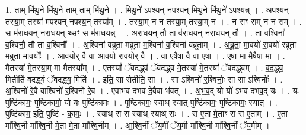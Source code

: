 \documentclass[17pt]{extarticle}
\begin{document}
1. ताम् मि॑थु॒ने मि॑थु॒ने ताम् ताम् मि॑थु॒ने । . मि॒थु॒ने॑ ऽपश्यन् नपश्यन् मिथु॒ने मि॑थु॒ने॑ ऽपश्यन्न् । . अ॒प॒श्य॒न् तस्या॒म् तस्या॑ मपश्यन् नपश्य॒न् तस्या᳚म् । . तस्या॒म् न न तस्या॒म् तस्या॒म् न । . न सꣳ सम् न न सम् । . स म॑राधयन् नराधय॒न् थ्सꣳ स म॑राधयन्न् । . अ॒रा॒ध॒य॒न् तौ ता व॑राधयन् नराधय॒न् तौ । . ता व॒श्विना॑ व॒श्विनौ॒ तौ ता व॒श्विनौ᳚ । . अ॒श्विना॑ वब्रूता मब्रूता म॒श्विना॑ व॒श्विना॑ वब्रूताम् । . अ॒ब्रू॒ता॒ मा॒वयो॑ रा॒वयो॑ रब्रूता मब्रूता मा॒वयोः᳚ । . आ॒वयो॒र् वै वा आ॒वयो॑ रा॒वयो॒र् वै । . वा ए॒षैषा वै वा ए॒षा । . ए॒षा मा मैषैषा मा । . मैतस्या॑ मे॒तस्या॒म् मा मैतस्या᳚म् । . ए॒तस्यां᳚ ॅवदद्ध्वं ॅवदद्ध्व मे॒तस्या॑ मे॒तस्यां᳚ ॅवदद्ध्वम् । . व॒द॒द्ध्व॒ मितीति॑ वदद्ध्वं ॅवदद्ध्व॒ मिति॑ । . इति॒ सा सेतीति॒ सा । . सा ऽश्विनो॑ र॒श्विनोः॒ सा सा ऽश्विनोः᳚ । . अ॒श्विनो॑ रे॒वै वाश्विनो॑ र॒श्विनो॑ रे॒व । . ए॒वाभ॑व दभव दे॒वैवा भ॑वत् । . अ॒भ॒व॒द् यो यो॑ ऽभव दभव॒द् यः । . यः पुष्टि॑कामः॒ पुष्टि॑कामो॒ यो यः पुष्टि॑कामः । . पुष्टि॑कामः॒ स्याथ् स्यात् पुष्टि॑कामः॒ पुष्टि॑कामः॒ स्यात् । . पुष्टि॑काम॒ इति॒ पुष्टि॑ - का॒मः॒ । . स्याथ् स स स्याथ् स्याथ् सः । . स ए॒ता मे॒ताꣳ स स ए॒ताम् । . ए॒ता मा᳚श्वि॒नी मा᳚श्वि॒नी मे॒ता मे॒ता मा᳚श्वि॒नीम् । . आ॒श्वि॒नीं ॅय॒मीं ॅय॒मी मा᳚श्वि॒नी मा᳚श्वि॒नीं ॅय॒मीम् । \newline
\end{document}
